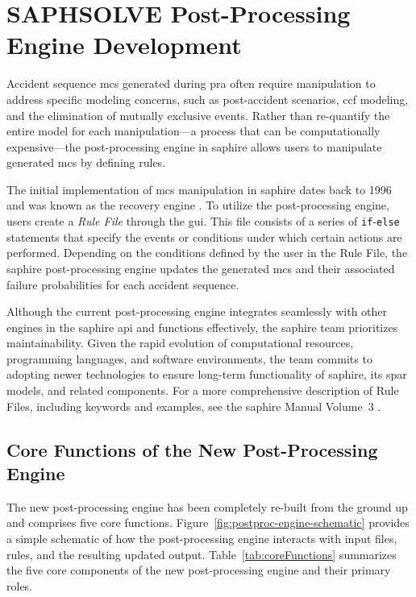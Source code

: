 \section{SAPHSOLVE Post-Processing Engine Development}
\label{sec:saphsolve-devel}

Accident sequence \acrshort{mcs} generated during \acrshort{pra} often require manipulation to address specific modeling concerns, such as post-accident scenarios, \acrshort{ccf} modeling, and the elimination of mutually exclusive events. Rather than re-quantify the entire model for each manipulation---a process that can be computationally expensive---the post-processing engine in \acrshort{saphire} allows users to manipulate generated \acrshort{mcs} by defining rules.

The initial implementation of \acrshort{mcs} manipulation in \acrshort{saphire} dates back to 1996 and was known as the recovery engine \cite{Smith1996SAPHIRE}. To utilize the post-processing engine, users create a \emph{Rule File} through the \acrshort{gui}. This file consists of a series of \texttt{if}-\texttt{else} statements that specify the events or conditions under which certain actions are performed. Depending on the conditions defined by the user in the Rule File, the \acrshort{saphire} post-processing engine updates the generated \acrshort{mcs} and their associated failure probabilities for each accident sequence.

Although the current post-processing engine integrates seamlessly with other engines in the \acrshort{saphire} \acrshort{api} and functions effectively, the \acrshort{saphire} team prioritizes maintainability. Given the rapid evolution of computational resources, programming languages, and software environments, the team commits to adopting newer technologies to ensure long-term functionality of \acrshort{saphire}, its \acrfull{spar} models, and related components. For a more comprehensive description of Rule Files, including keywords and examples, see the \acrshort{saphire} Manual Volume~3 \cite{saphire_manual}.

\subsection{Core Functions of the New Post-Processing Engine}
\label{sec:core-functions}

The new post-processing engine has been completely re-built from the ground up and comprises five core functions. Figure~\ref{fig:postproc-engine-schematic} provides a simple schematic of how the post-processing engine interacts with input files, rules, and the resulting updated output. Table~\ref{tab:coreFunctions} summarizes the five core components of the new post-processing engine and their primary roles. 

